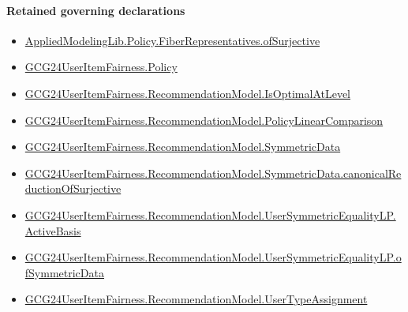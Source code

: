 \documentclass[10pt]{article}
\begin{document}
\paragraph{Retained governing declarations}
\begin{itemize}\raggedright
\item \hyperlink{governing-declaration-b7bb3a1759e76a2c}{Applied\allowbreak{}Modeling\allowbreak{}Lib.\allowbreak{}Policy.\allowbreak{}Fiber\allowbreak{}Representatives.\allowbreak{}of\allowbreak{}Surjective}
\item \hyperlink{governing-declaration-34ca6b905b48428a}{GCG24\allowbreak{}User\allowbreak{}Item\allowbreak{}Fairness.\allowbreak{}Policy}
\item \hyperlink{paper-prerequisite-4b6f9efb494da04e}{GCG24\allowbreak{}User\allowbreak{}Item\allowbreak{}Fairness.\allowbreak{}Recommendation\allowbreak{}Model.\allowbreak{}Is\allowbreak{}Optimal\allowbreak{}At\allowbreak{}Level}
\item \hyperlink{governing-declaration-7c21c6c7c579da59}{GCG24\allowbreak{}User\allowbreak{}Item\allowbreak{}Fairness.\allowbreak{}Recommendation\allowbreak{}Model.\allowbreak{}Policy\allowbreak{}Linear\allowbreak{}Comparison}
\item \hyperlink{governing-declaration-5bf2c3489c614d0a}{GCG24\allowbreak{}User\allowbreak{}Item\allowbreak{}Fairness.\allowbreak{}Recommendation\allowbreak{}Model.\allowbreak{}Symmetric\allowbreak{}Data}
\item \hyperlink{governing-declaration-74d9be2e84dd2134}{GCG24\allowbreak{}User\allowbreak{}Item\allowbreak{}Fairness.\allowbreak{}Recommendation\allowbreak{}Model.\allowbreak{}Symmetric\allowbreak{}Data.\allowbreak{}canonical\allowbreak{}Reduction\allowbreak{}Of\allowbreak{}Surjective}
\item \hyperlink{governing-declaration-7310452b7f3db021}{GCG24\allowbreak{}User\allowbreak{}Item\allowbreak{}Fairness.\allowbreak{}Recommendation\allowbreak{}Model.\allowbreak{}User\allowbreak{}Symmetric\allowbreak{}Equality\allowbreak{}LP.\allowbreak{}Active\allowbreak{}Basis}
\item \hyperlink{governing-declaration-fa6bdf5a75c5b678}{GCG24\allowbreak{}User\allowbreak{}Item\allowbreak{}Fairness.\allowbreak{}Recommendation\allowbreak{}Model.\allowbreak{}User\allowbreak{}Symmetric\allowbreak{}Equality\allowbreak{}LP.\allowbreak{}of\allowbreak{}Symmetric\allowbreak{}Data}
\item \hyperlink{governing-declaration-ff90b1efab93f1aa}{GCG24\allowbreak{}User\allowbreak{}Item\allowbreak{}Fairness.\allowbreak{}Recommendation\allowbreak{}Model.\allowbreak{}User\allowbreak{}Type\allowbreak{}Assignment}

\end{itemize}
\end{document}
